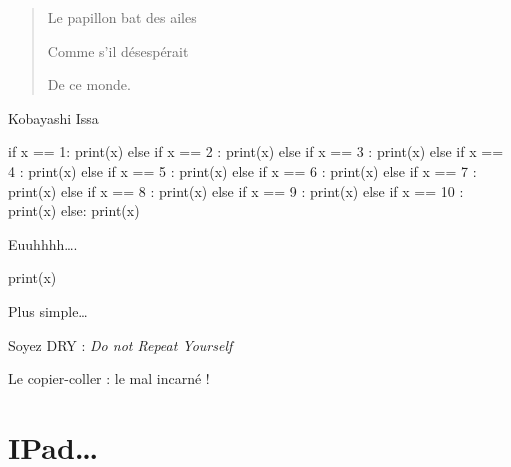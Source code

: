 \documentclass[french]{beamer}
\begin{document}
\begin{frame}

\begin{quote}
Le papillon bat des ailes

Comme s'il désespérait

De ce monde.
\end{quote}

Kobayashi Issa

\end{frame}


\begin{frame}[fragile]

  \begin{pythoncode}
if x == 1:
   print(x)
else if x == 2 :
   print(x)
else if x == 3 :
   print(x)
else if x == 4 :
   print(x)
else if x == 5 :
   print(x)
else if x == 6 :
   print(x)
else if x == 7 :
   print(x)
else if x == 8 :
   print(x)
else if x == 9 :
   print(x)
else if x == 10 :
   print(x)
else:
   print(x)
\end{pythoncode}




Euuhhhh\ldots{}.

\end{frame}

\begin{frame}[fragile]

  \begin{pythoncode}
print(x)
\end{pythoncode}




Plus simple\ldots{}

Soyez DRY : \emph{Do not Repeat Yourself}

Le copier-coller : le mal incarné !

\end{frame}



\section{IPad\ldots{}}
\end{document}
